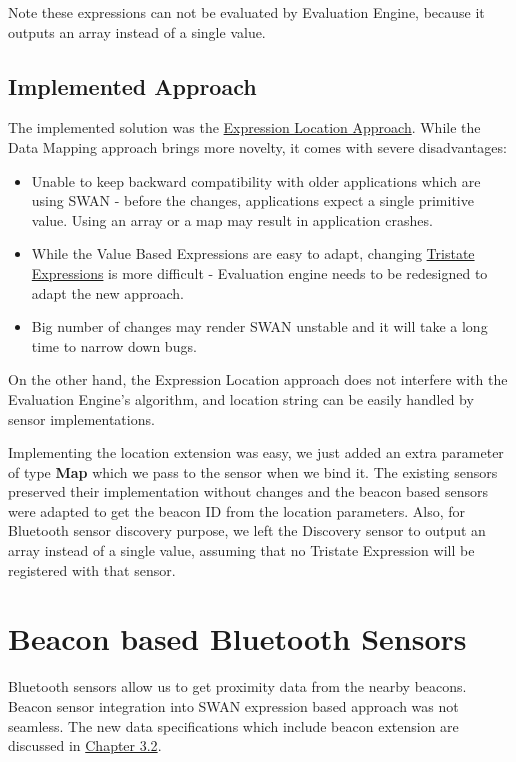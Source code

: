 Note these expressions can not be evaluated by Evaluation Engine, because it outputs an array instead of a single value.


\subsection{Implemented Approach}
The implemented solution was the \hyperref[sssec:exprlocation]{Expression Location Approach}.
While the Data Mapping approach brings more novelty, it comes with severe disadvantages:
\begin{itemize}
 \item Unable to keep backward compatibility with older applications which are using SWAN - before the changes, applications
 expect a single primitive value. Using an array or a map may result in application crashes.
 \item While the Value Based Expressions are easy to adapt, changing \hyperref[swan_song_expressions]{Tristate Expressions} is more difficult - Evaluation engine needs to be redesigned to adapt the new approach.
 \item Big number of changes may render SWAN unstable and it will take a long time to narrow down bugs.
\end{itemize}

On the other hand, the Expression Location approach does not interfere with the Evaluation Engine's algorithm, and location string can be easily 
handled by sensor implementations. 

Implementing the location extension was easy, we just added an extra parameter of type \textbf{Map}\cite{map} which we pass to the sensor
when we bind it.
The existing sensors preserved their implementation without changes and the beacon based sensors were adapted to get the beacon ID from the location parameters.
Also, for Bluetooth sensor discovery purpose, we left the Discovery sensor to output an array instead of a single value, assuming that no Tristate Expression will be registered with that 
sensor.

\section{Beacon based Bluetooth Sensors}

Bluetooth sensors allow us to get proximity data from the nearby beacons. Beacon sensor integration into SWAN expression based approach was not seamless.
The new data specifications which include beacon extension are discussed in \hyperref[Chapter3.2]{Chapter 3.2}.


